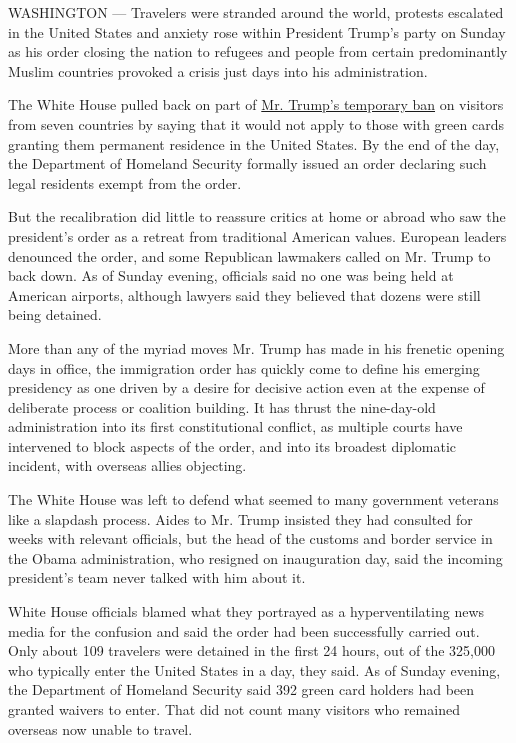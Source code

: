 WASHINGTON --- Travelers were stranded around the world, protests
escalated in the United States and anxiety rose within President Trump's
party on Sunday as his order closing the nation to refugees and people
from certain predominantly Muslim countries provoked a crisis just days
into his administration.

The White House pulled back on part of
\href{https://www.nytimes3xbfgragh.onion/2017/01/28/us/refugees-detained-at-us-airports-prompting-legal-challenges-to-trumps-immigration-order.html?_r=0}{Mr.
Trump's temporary ban} on visitors from seven countries by saying that
it would not apply to those with green cards granting them permanent
residence in the United States. By the end of the day, the Department of
Homeland Security formally issued an order declaring such legal
residents exempt from the order.

But the recalibration did little to reassure critics at home or abroad
who saw the president's order as a retreat from traditional American
values. European leaders denounced the order, and some Republican
lawmakers called on Mr. Trump to back down. As of Sunday evening,
officials said no one was being held at American airports, although
lawyers said they believed that dozens were still being detained.

More than any of the myriad moves Mr. Trump has made in his frenetic
opening days in office, the immigration order has quickly come to define
his emerging presidency as one driven by a desire for decisive action
even at the expense of deliberate process or coalition building. It has
thrust the nine-day-old administration into its first constitutional
conflict, as multiple courts have intervened to block aspects of the
order, and into its broadest diplomatic incident, with overseas allies
objecting.

The White House was left to defend what seemed to many government
veterans like a slapdash process. Aides to Mr. Trump insisted they had
consulted for weeks with relevant officials, but the head of the customs
and border service in the Obama administration, who resigned on
inauguration day, said the incoming president's team never talked with
him about it.

White House officials blamed what they portrayed as a hyperventilating
news media for the confusion and said the order had been successfully
carried out. Only about 109 travelers were detained in the first 24
hours, out of the 325,000 who typically enter the United States in a
day, they said. As of Sunday evening, the Department of Homeland
Security said 392 green card holders had been granted waivers to enter.
That did not count many visitors who remained overseas now unable to
travel.

